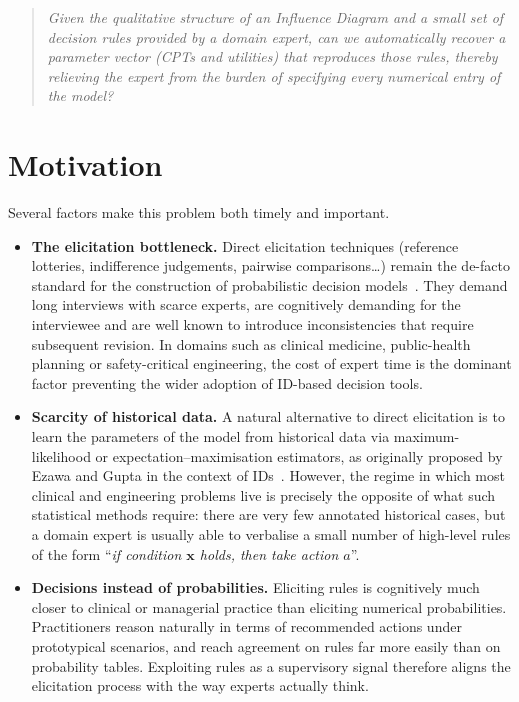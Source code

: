 \begin{quote}\itshape
Given the qualitative structure of an Influence Diagram and a small
set of decision rules provided by a domain expert, can we
automatically recover a parameter vector (CPTs and utilities) that
reproduces those rules, thereby relieving the expert from the burden
of specifying every numerical entry of the model?
\end{quote}


\section{Motivation}
\label{sec:motivation}

Several factors make this problem both timely and important.

\begin{itemize}
  \item \textbf{The elicitation bottleneck.} Direct elicitation techniques
        (reference lotteries, indifference judgements, pairwise
        comparisons\ldots) remain the de-facto standard for the construction of
        probabilistic decision models~\cite{bielza2010modeling}. They demand
        long interviews with scarce experts, are cognitively demanding for the
        interviewee and are well known to introduce inconsistencies that require
        subsequent revision. In domains such as clinical medicine, public-health
        planning or safety-critical engineering, the cost of expert time is the
        dominant factor preventing the wider adoption of ID-based decision
        tools.

  \item \textbf{Scarcity of historical data.} A natural alternative to direct
        elicitation is to learn the parameters of the model from historical data
        via maximum-likelihood or expectation--maximisation estimators, as
        originally proposed by Ezawa and Gupta in the context of
        IDs~\cite{ezawa1997learning}. However, the regime in which most clinical
        and engineering problems live is precisely the opposite of what such
        statistical methods require: there are very few annotated historical
        cases, but a domain expert is usually able to verbalise a small number
        of high-level rules of the form ``\emph{if condition $\mathbf{x}$ holds,
        then take action $a$}''.

  \item \textbf{Decisions instead of probabilities.} Eliciting rules is
        cognitively much closer to clinical or managerial practice than
        eliciting numerical probabilities. Practitioners reason naturally in
        terms of recommended actions under prototypical scenarios, and reach
        agreement on rules far more easily than on probability tables.
        Exploiting rules as a supervisory signal therefore aligns the
        elicitation process with the way experts actually think.



\end{itemize}
